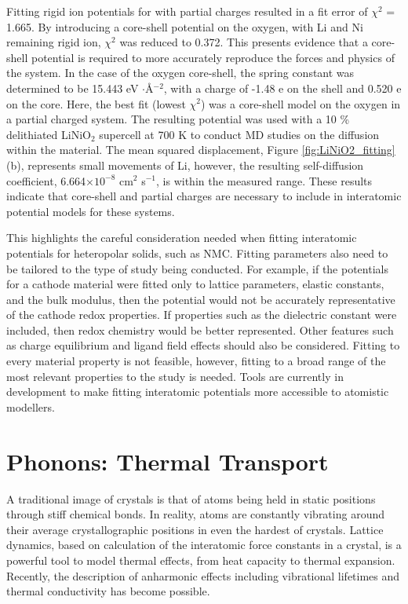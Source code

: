 \documentclass[journal=jacsat,manuscript=article]{achemso}
\begin{document}
Fitting rigid ion potentials for  with partial charges resulted in a fit error of $\chi^2$ = 1.665.
By introducing a core-shell potential on the oxygen, with Li and Ni remaining rigid ion, $\chi^2$ was reduced to 0.372. 
This presents evidence that a core-shell potential is required to more accurately reproduce the forces and physics of the system.
In the case of the oxygen core-shell, the spring constant was determined to be 15.443 eV $\cdot$\AA$^{-2}$, with a charge of -1.48 e on the shell and 0.520 e on the core.
Here, the best fit (lowest $\chi^2$) was a core-shell model on the oxygen in a partial charged system. The resulting potential was used with a 10 \% delithiated LiNiO$_2$ supercell at 700 K to conduct MD studies on the diffusion within the material.
The mean squared displacement, Figure \ref{fig:LiNiO2_fitting} (b), represents small movements of Li, however, the resulting self-diffusion coefficient, 6.664$\times 10^{-8}$  cm$^{2}$ s$^{-1}$, is within the measured range.\cite{Nakamura2000,bruce1992vacancy}
These results indicate that core-shell and partial charges are necessary to include in interatomic potential models for these systems.

This highlights the careful consideration needed when fitting interatomic potentials for heteropolar solids, such as NMC.
Fitting parameters also need to be tailored to the type of study being conducted.
For example, if the potentials for a cathode material were fitted only to lattice parameters, elastic constants, and the bulk modulus, then the potential would not be accurately representative of the cathode redox properties. 
If properties such as the dielectric constant were included, then redox chemistry would be better represented.
Other features such as charge equilibrium and ligand field effects should also be considered. 
Fitting to every material property is not feasible, however, fitting to a broad range of the most relevant properties to the study is needed. 
Tools are currently in development to make fitting interatomic potentials more accessible to atomistic modellers.\cite{gale_empirical_1996,Stukowski_2017,wen_kim-compliant_2017,Morgan2020PopOff}

\section*{Phonons: Thermal Transport}
A traditional image of crystals is that of atoms being held in static positions through stiff chemical bonds. 
In reality, atoms are constantly vibrating around their average crystallographic positions in even the hardest of crystals. 
Lattice dynamics, based on calculation of the interatomic force constants in a crystal, is a powerful tool to model thermal effects, from heat capacity to thermal expansion.
Recently, the description of anharmonic effects including vibrational lifetimes and thermal conductivity has become possible.
\end{document}
